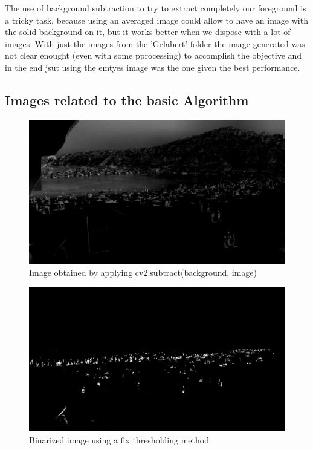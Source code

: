 \documentclass[11pt]{article}
\begin{document}
The use of background subtraction to try to extract completely our foreground is a tricky task, because using an averaged image could allow to have an image with the solid background on it, but it works better when we dispose with a lot of images. With just the images from the 'Gelabert' folder the image generated was not clear enought (even with some pprocessing) to accomplish the objective and in the end jsut using the emtyes image was the one given the best performance.\newline


\newpage
\begin{appendices}
    \section{Images related to the basic Algorithm}

    

    \begin{figure}[h]
        \centering
        \includegraphics[width=\textwidth, height=\textheight, keepaspectratio]{img/sub.jpg}
        \caption{Image obtained by applying cv2.subtract(background, image)}
        \label{fig:sub}
    \end{figure}

    \begin{figure} [h]
        \centering
        \includegraphics[width=\textwidth]{img/bin_th.jpg}
        \caption{Binarized image using a fix thresholding method}
        \label{fig:binth}
    \end{figure}
    

\end{appendices}
\end{document}
